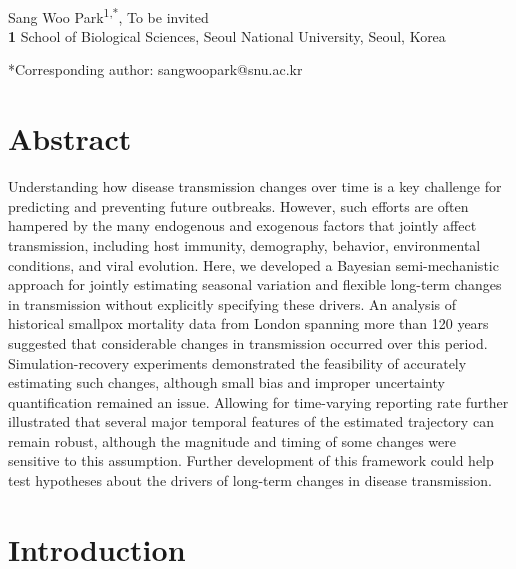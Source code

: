 \documentclass[12pt]{article}
\date{\today}
\begin{document}
\begin{flushleft}{
	\Large
	\textbf{}
}
\newline
\\
Sang Woo Park\textsuperscript{1,*}, To be invited
\\
\bigskip
\textbf{1} School of Biological Sciences, Seoul National University, Seoul, Korea
\bigskip

*Corresponding author: sangwoopark@snu.ac.kr
\end{flushleft}

\section*{Abstract}

Understanding how disease transmission changes over time is a key challenge for predicting and preventing future outbreaks.
However, such efforts are often hampered by the many endogenous and exogenous factors that jointly affect transmission, including host immunity, demography, behavior, environmental conditions, and viral evolution.
Here, we developed a Bayesian semi-mechanistic approach for jointly estimating seasonal variation and flexible long-term changes in transmission without explicitly specifying these drivers.
An analysis of historical smallpox mortality data from London spanning more than 120 years suggested that considerable changes in transmission occurred over this period.
Simulation-recovery experiments demonstrated the feasibility of accurately estimating such changes, although small bias and improper uncertainty quantification remained an issue.
Allowing for time-varying reporting rate further illustrated that several major temporal features of the estimated trajectory can remain robust, although the magnitude and timing of some changes were sensitive to this assumption.
Further development of this framework could help test hypotheses about the drivers of long-term changes in disease transmission.

\pagebreak

\section*{Introduction}
\end{document}
